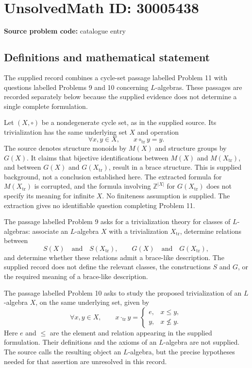 \documentclass[11pt]{article}
\begin{document}
\section*{UnsolvedMath ID: 30005438}
\textbf{Source problem code:} catalogue entry
\subsection{Definitions and mathematical statement}
The supplied record combines a cycle-set passage labelled Problem 11 with questions labelled Problems 9 and 10 concerning \(L\)-algebras. These passages are recorded separately below because the supplied evidence does not determine a single complete formulation.

Let \((X,\circ)\) be a nondegenerate cycle set, as in the supplied source. Its trivialization has the same underlying set \(X\) and operation
\[
\forall x,y\in X,\qquad x\circ_{\mathrm{tr}}y=y.
\]
The source denotes structure monoids by \(M(X)\) and structure groups by \(G(X)\). It claims that bijective identifications between \(M(X)\) and \(M(X_{\mathrm{tr}})\), and between \(G(X)\) and \(G(X_{\mathrm{tr}})\), result in a brace structure. This is supplied background, not a conclusion established here. The extracted formula for \(M(X_{\mathrm{tr}})\) is corrupted, and the formula involving \(\mathbb Z^{|X|}\) for \(G(X_{\mathrm{tr}})\) does not specify its meaning for infinite \(X\). No finiteness assumption is supplied. The extraction gives no identifiable question completing Problem 11.

The passage labelled Problem 9 asks for a trivialization theory for classes of \(L\)-algebras: associate an \(L\)-algebra \(X\) with a trivialization \(X_{\mathrm{tr}}\), determine relations between
\[
S(X)\quad\text{and}\quad S(X_{\mathrm{tr}}),
\qquad
G(X)\quad\text{and}\quad G(X_{\mathrm{tr}}),
\]
and determine whether these relations admit a brace-like description. The supplied record does not define the relevant classes, the constructions \(S\) and \(G\), or the required meaning of a brace-like description.

The passage labelled Problem 10 asks to study the proposed trivialization of an \(L\)-algebra \(X\), on the same underlying set, given by
\[
\forall x,y\in X,\qquad
x\mathbin{\cdot_{\mathrm{tr}}}y=
\begin{cases}
e,&x\leq y,\\
y,&x\nleq y.
\end{cases}
\]
Here \(e\) and \(\leq\) are the element and relation appearing in the supplied formulation. Their definitions and the axioms of an \(L\)-algebra are not supplied. The source calls the resulting object an \(L\)-algebra, but the precise hypotheses needed for that assertion are unresolved in this record.
\end{document}
